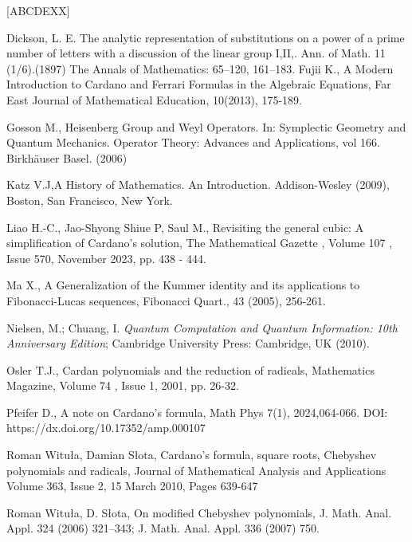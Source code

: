 \documentclass[11pt,reqno]{amsart}
\begin{document}
%
%
\begin{thebibliography}{[ABCDEXX]}

Dickson, L. E. The analytic representation of substitutions on a power of a prime number of letters with a discussion of the linear group I,II,. Ann. of Math. 11 (1/6).(1897) The Annals of Mathematics: 65–120, 161–183.
 Fujii K., A Modern Introduction to Cardano and Ferrari Formulas in the Algebraic Equations, Far East Journal of Mathematical Education, 10(2013), 175-189.

 Gosson M., Heisenberg Group and Weyl Operators. In: Symplectic Geometry and Quantum Mechanics. Operator Theory: Advances and Applications, vol 166. Birkhäuser Basel. (2006)

 Katz V.J,A History of Mathematics. An Introduction. Addison-Wesley (2009), Boston,
San Francisco, New York.

 Liao H.-C., Jao-Shyong Shiue P, Saul M., Revisiting the general cubic: A simplification of Cardano's solution, The Mathematical Gazette , Volume 107 , Issue 570, November 2023, pp. 438 - 444.   
 
 Ma X., A Generalization of the Kummer identity and its applications to  Fibonacci-Lucas sequences, Fibonacci Quart., 43 (2005), 256-261.

Nielsen, M.; Chuang, I. \emph{Quantum Computation and Quantum Information: 10th Anniversary Edition}; Cambridge University Press: Cambridge, UK (2010).


 Osler T.J.,  Cardan polynomials and the reduction of radicals, Mathematics Magazine, Volume 74 , Issue 1, 2001, pp. 26-32.   
 
 Pfeifer D., A note on Cardano’s formula,  Math Phys 7(1), 2024,064-066. DOI: https://dx.doi.org/10.17352/amp.000107

 Roman Wituła, Damian Słota, Cardano’s formula, square roots, Chebyshev polynomials and radicals, 
Journal of Mathematical Analysis and Applications
Volume 363, Issue 2, 15 March 2010, Pages 639-647

 Roman Wituła,  D. Słota, On modified Chebyshev polynomials, J. Math. Anal. Appl. 324 (2006) 321–343; J. Math. Anal. Appl. 336 (2007) 750.


\end{thebibliography}
\end{document}
